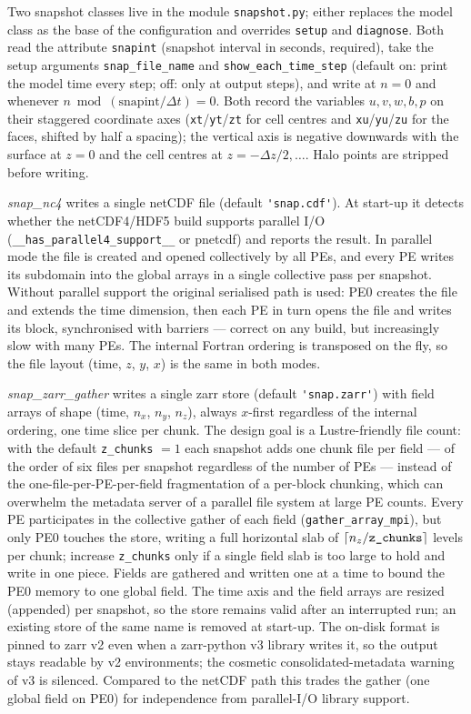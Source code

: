 \documentclass[12pt]{article}
\begin{document}
Two snapshot classes live in the module \verb|snapshot.py|; either
replaces the model class as the base of the configuration and overrides
\verb|setup| and \verb|diagnose|. Both read the attribute \verb|snapint|
(snapshot interval in seconds, required), take the setup arguments
\verb|snap_file_name| and \verb|show_each_time_step| (default on: print
the model time every step; off: only at output steps), and write at
$n = 0$ and whenever $n \bmod (\mathrm{snapint}/\Delta t) = 0$. Both
record the variables $u,v,w,b,p$ on their staggered coordinate axes
(\verb|xt|/\verb|yt|/\verb|zt| for cell centres and
\verb|xu|/\verb|yu|/\verb|zu| for the faces, shifted by half a spacing);
the vertical axis is negative downwards with the surface at $z = 0$ and
the cell centres at $z = -\Delta z/2, \ldots$. Halo points are stripped
before writing.

\emph{snap\_nc4} writes a single netCDF file (default \verb|'snap.cdf'|).
At start-up it detects whether the netCDF4/HDF5 build supports parallel
I/O (\verb|__has_parallel4_support__| or pnetcdf) and reports the result.
In parallel mode the file is created and opened collectively by all PEs,
and every PE writes its subdomain into the global arrays in a single
collective pass per snapshot. Without parallel support the original
serialised path is used: PE0 creates the file and extends the time
dimension, then each PE in turn opens the file and writes its block,
synchronised with barriers --- correct on any build, but increasingly
slow with many PEs. The internal Fortran ordering is transposed on the
fly, so the file layout (time, $z$, $y$, $x$) is the same in both modes.

\emph{snap\_zarr\_gather} writes a single zarr store (default
\verb|'snap.zarr'|) with field arrays of shape (time, $n_x$, $n_y$,
$n_z$), always $x$-first regardless of the internal ordering, one time
slice per chunk. The design goal is a Lustre-friendly file count: with
the default \verb|z_chunks| $= 1$ each snapshot adds one chunk file per
field --- of the order of six files per snapshot regardless of the number
of PEs --- instead of the one-file-per-PE-per-field fragmentation of a
per-block chunking, which can overwhelm the metadata server of a parallel
file system at large PE counts. Every PE participates in the collective
gather of each field (\verb|gather_array_mpi|), but only PE0 touches the
store, writing a full horizontal slab of $\lceil n_z/\verb|z_chunks|
\rceil$ levels per chunk; increase \verb|z_chunks| only if a single field
slab is too large to hold and write in one piece. Fields are gathered and
written one at a time to bound the PE0 memory to one global field. The
time axis and the field arrays are resized (appended) per snapshot, so
the store remains valid after an interrupted run; an existing store of
the same name is removed at start-up. The on-disk format is pinned to
zarr v2 even when a zarr-python v3 library writes it, so the output stays
readable by v2 environments; the cosmetic consolidated-metadata warning
of v3 is silenced. Compared to the netCDF path this trades the gather
(one global field on PE0) for independence from parallel-I/O library
support.
\end{document}
